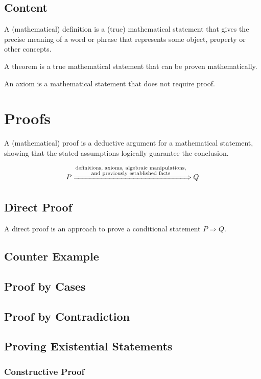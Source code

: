 \documentclass[a4paper]{article}
\begin{document}
\subsection{Content}

A (mathematical) definition is a (true) mathematical statement that gives the precise meaning of a word
or phrase that represents some object, property or other concepts.

A theorem is a true mathematical statement that can be proven mathematically.

An axiom is a mathematical statement that does not require proof.

\section{Proofs}

A (mathematical) proof is a deductive argument for a mathematical statement, showing that the stated assumptions logically guarantee the conclusion.

\[
P \xLongrightarrow{\substack{
		\text{definitions, axioms, algebraic manipulations,} \\
		\text{and previously established facts}
}} Q
\]

\subsection{Direct Proof}

A direct proof is an approach to prove a conditional statement $P \Rightarrow Q$.

\subsection{Counter Example}

\subsection{Proof by Cases}

\subsection{Proof by Contradiction}

\subsection{Proving Existential Statements}

\subsubsection{Constructive Proof}
\end{document}
